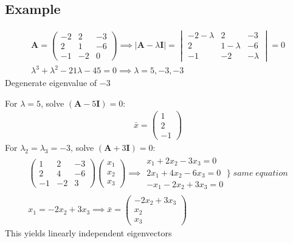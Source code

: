 \documentclass[a4paper, 11pt, normalem]{report}
\begin{document}
\subsection{Example}
\begin{gather*}
    \mathbf{A} =
    \begin{pmatrix}
        -2 &  2 & -3 \\
         2 &  1 & -6 \\
        -1 & -2 &  0
    \end{pmatrix} \implies |\mathbf{A} - \lambda\mathbf{I}| =
    \begin{vmatrix}
        -2 - \lambda &           2 &       -3 \\
                   2 & 1 - \lambda &       -6 \\
                  -1 &          -2 & -\lambda
    \end{vmatrix} = 0 \\
    \lambda^3 + \lambda^2 -21\lambda - 45 = 0 \implies \lambda = 5,-3,-3
\end{gather*}
Degenerate eigenvalue of $-3$

For $\lambda = 5$, solve $(\mathbf{A} - 5\mathbf{I}) = 0$:
\begin{gather*}
    \bar{x} =
    \begin{pmatrix}
         1 \\
         2 \\
        -1
    \end{pmatrix}
\end{gather*}
For $\lambda_2 = \lambda_3 = -3$, solve $(\mathbf{A} + 3\mathbf{I}) = 0$:
\begin{gather*}
    \begin{pmatrix}
         1 &  2 & -3 \\
         2 &  4 & -6 \\
        -1 & -2 &  3
    \end{pmatrix}
    \begin{pmatrix}
        x_1 \\
        x_2 \\
        x_3
    \end{pmatrix} \implies
    \begin{matrix}
         x_1 + 2x_2 - 3x_3 = 0 \\
        2x_1 + 4x_2 - 6x_3 = 0 \\
        -x_1 - 2x_2 + 3x_3 = 0
    \end{matrix} \Bigg\}\; same \;equation \\
    x_1 = -2x_2 + 3x_3 \implies \bar{x} =
    \begin{pmatrix}
        -2x_2 + 3x_3 \\
                 x_2 \\
                 x_3
    \end{pmatrix}
\end{gather*}
This yields linearly independent eigenvectors
\end{document}
